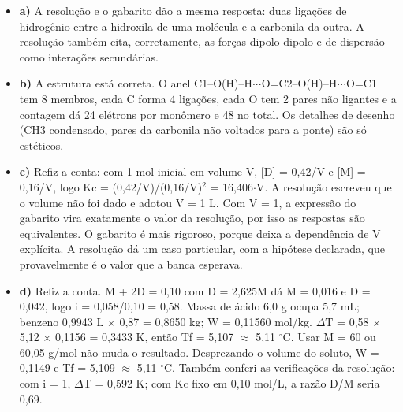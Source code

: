 \documentclass{article}%
\begin{document}
\begin{itemize}%
\item%
\textbf{a)} A resolução e o gabarito dão a mesma resposta: duas ligações de hidrogênio entre a hidroxila de uma molécula e a carbonila da outra. A resolução também cita, corretamente, as forças dipolo{-}dipolo e de dispersão como interações secundárias.%
\item%
\textbf{b)} A estrutura está correta. O anel C1--O(H)--H$\cdot$$\cdot$$\cdot$O=C2--O(H)--H$\cdot$$\cdot$$\cdot$O=C1 tem 8 membros, cada C forma 4 ligações, cada O tem 2 pares não ligantes e a contagem dá 24 elétrons por monômero e 48 no total. Os detalhes de desenho (CH3 condensado, pares da carbonila não voltados para a ponte) são só estéticos.%
\item%
\textbf{c)} Refiz a conta: com 1 mol inicial em volume V, {[}D{]} = 0,42/V e {[}M{]} = 0,16/V, logo Kc = (0,42/V)/(0,16/V)$^2$ = 16,406$\cdot$V. A resolução escreveu que o volume não foi dado e adotou V = 1 L. Com V = 1, a expressão do gabarito vira exatamente o valor da resolução, por isso as respostas são equivalentes. O gabarito é mais rigoroso, porque deixa a dependência de V explícita. A resolução dá um caso particular, com a hipótese declarada, que provavelmente é o valor que a banca esperava.%
\item%
\textbf{d)} Refiz a conta. M + 2D = 0,10 com D = 2,625M dá M = 0,016 e D = 0,042, logo i = 0,058/0,10 = 0,58. Massa de ácido 6,0 g ocupa 5,7 mL; benzeno 0,9943 L $\times$ 0,87 = 0,8650 kg; W = 0,11560 mol/kg. $\Delta$T = 0,58 $\times$ 5,12 $\times$ 0,1156 = 0,3433 K, então Tf = 5,107 $\approx$ 5,11 $^\circ$C. Usar M = 60 ou 60,05 g/mol não muda o resultado. Desprezando o volume do soluto, W = 0,1149 e Tf = 5,109 $\approx$ 5,11 $^\circ$C. Também conferi as verificações da resolução: com i = 1, $\Delta$T = 0,592 K; com Kc fixo em 0,10 mol/L, a razão D/M seria 0,69.%
\end{itemize}%
\end{document}
